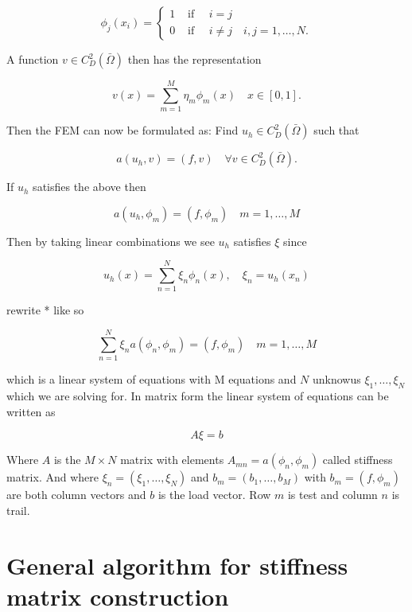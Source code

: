 \documentclass[12pt, oneside]{book}
\begin{document}
$$
\phi_{j}\left(x_{i}\right)= \begin{cases}1 & \text { if } \quad i=j \\ 0 & \text { if } \quad i \neq j \quad i, j=1, \ldots, N.\end{cases}
$$

A function $v \in C_{D}^{2}(\bar{\Omega})$ then has the representation

$$
v(x)=\sum_{m=1}^{M} \eta_{m} \phi_{m}(x) \quad x \in[0,1].
$$

Then the FEM can now be formulated as: Find $u_{h} \in C_{D}^{2}(\bar{\Omega})$ such that

$$
a\left(u_{h}, v\right)=(f, v) \quad \forall v \in C_{D}^{2}(\bar{\Omega}).
$$

If $u_{h}$ satisfies the above then

\begin{equation}
a\left(u_{h}, \phi_{m}\right)=\left(f, \phi_{m}\right) \quad m=1, \ldots, M  \tag{*}
\end{equation}

Then by taking linear combinations we see $u_h$ satisfies $\xi$ since

$$
u_{h}(x)=\sum_{n=1}^{N} \xi_{n} \phi_{n}(x), \quad \xi_{n}=u_{h}\left(x_{n}\right)
$$

rewrite * like so

$$
\sum_{n=1}^{N} \xi_{n} a\left(\phi_{n}, \phi_{m}\right)=\left(f, \phi_{m}\right) \quad m=1, \ldots, M
$$

which is a linear system of equations with M equations and $N$ unknowus $\xi_{1}, \ldots, \xi_{N}$ which 
we are solving for. In matrix form the linear system of equations can be written as

$$
A \xi=b
$$

Where $A$ is the $M \times N$ matrix with elements $A_{m n}=a\left(\phi_{n}, \phi_{m}\right)$ 
called stiffness matrix. And where $\xi_n=\left(\xi_{1}, \ldots, \xi_{N}\right)$ and $b_m=\left(b_{1}, \ldots, b_{M}\right)$ 
with $b_{m}=\left(f, \phi_{m}\right)$ are both column vectors and $b$ is the load vector. Row $m$ is test and column $n$ 
is trail. 

\section{General algorithm for stiffness matrix construction}
\end{document}
